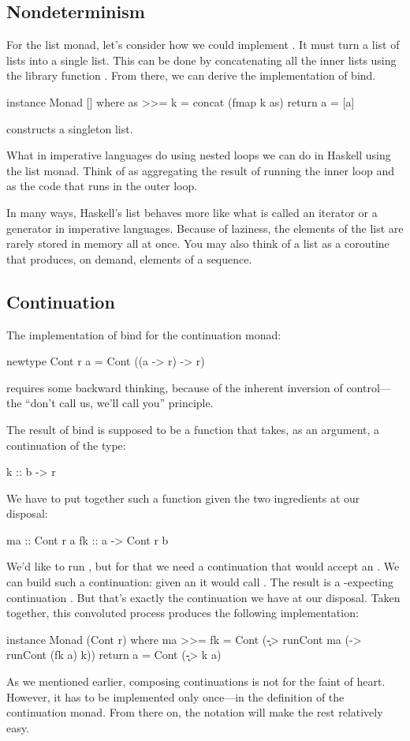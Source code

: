 \documentclass[DaoFP]{subfiles}
\begin{document}
\subsection{Nondeterminism}

For the list monad, let's consider how we could implement . It must turn a list of lists into a single list. This can be done by concatenating all the inner lists using the library function . From there, we can derive the implementation of bind.
\begin{haskell}
instance Monad [] where
  as >>= k = concat (fmap k as)
  return a = [a]
\end{haskell}
 constructs a singleton list.

What in imperative languages do using nested loops we can do in Haskell using the list monad. Think of  as aggregating the result of running the inner loop and  as the code that runs in the outer loop. 

In many ways, Haskell's list behaves more like what is called an iterator or a generator in imperative languages. Because of laziness, the elements of the list are rarely stored in memory all at once. You may also think of a list as a coroutine that produces, on demand, elements of a sequence.

\subsection{Continuation}

The implementation of bind for the continuation monad:

\begin{haskell}
newtype Cont r a = Cont ((a -> r) -> r)
\end{haskell}
requires some backward thinking, because of the inherent inversion of control---the ``don't call us, we'll call you'' principle. 

The result of bind is supposed to be a function that takes, as an argument, a continuation  of the type:
\begin{haskell}
k :: b -> r
\end{haskell}
We have to put together such a function given the two ingredients at our disposal: 
\begin{haskell}
ma :: Cont r a
fk :: a -> Cont r b
\end{haskell}
We'd like to run , but for that we need a continuation that would accept an . We can build such a continuation: given an  it would call . The result is a -expecting continuation . But that's exactly the continuation  we have at our disposal. Taken together, this convoluted process produces the following implementation:
\begin{haskell}
instance Monad (Cont r) where
  ma >>= fk = Cont (\k -> runCont ma (\a -> runCont (fk a) k))
  return a = Cont (\k -> k a)
\end{haskell}
As we mentioned earlier, composing continuations is not for the faint of heart. However, it has to be implemented only once---in the definition of the continuation monad. From there on, the  notation will make the rest relatively easy.
\end{document}
